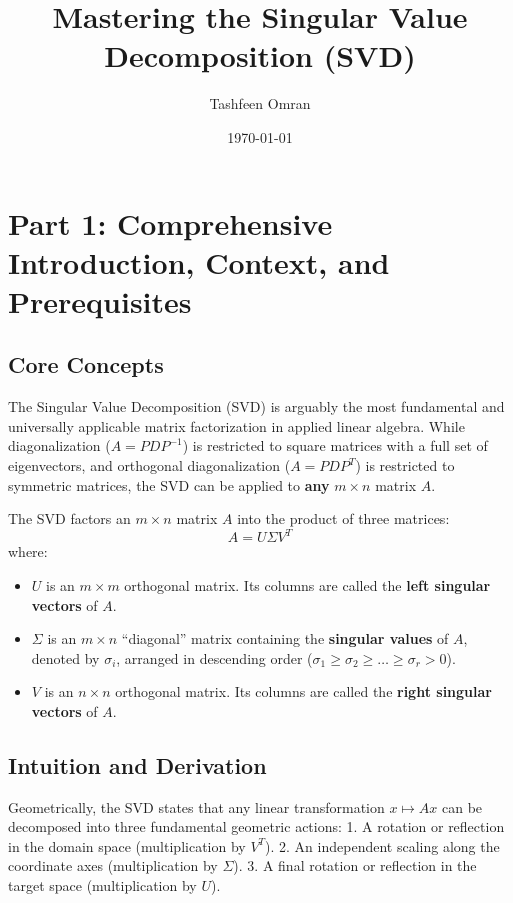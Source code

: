 \documentclass[11pt, letterpaper]{article}
\theoremstyle{definition}
\theoremstyle{remark}
\begin{document}
\title{\textbf{Mastering the Singular Value Decomposition (SVD)}}
\author{Tashfeen Omran}
\date{\today}
\maketitle

\tableofcontents
\newpage

\section{Part 1: Comprehensive Introduction, Context, and Prerequisites}

\subsection{Core Concepts}
The Singular Value Decomposition (SVD) is arguably the most fundamental and universally applicable matrix factorization in applied linear algebra. While diagonalization ($A = PDP^{-1}$) is restricted to square matrices with a full set of eigenvectors, and orthogonal diagonalization ($A = PDP^T$) is restricted to symmetric matrices, the SVD can be applied to \textbf{any} $m \times n$ matrix $A$. 

The SVD factors an $m \times n$ matrix $A$ into the product of three matrices:
\[ A = U \Sigma V^T \]
where:
\begin{itemize}
    \item $U$ is an $m \times m$ orthogonal matrix. Its columns are called the \textbf{left singular vectors} of $A$.
    \item $\Sigma$ is an $m \times n$ ``diagonal'' matrix containing the \textbf{singular values} of $A$, denoted by $\sigma_i$, arranged in descending order ($\sigma_1 \geq \sigma_2 \geq \dots \geq \sigma_r > 0$).
    \item $V$ is an $n \times n$ orthogonal matrix. Its columns are called the \textbf{right singular vectors} of $A$.
\end{itemize}

\subsection{Intuition and Derivation}
Geometrically, the SVD states that any linear transformation $x \mapsto Ax$ can be decomposed into three fundamental geometric actions:
1. A rotation or reflection in the domain space (multiplication by $V^T$).
2. An independent scaling along the coordinate axes (multiplication by $\Sigma$).
3. A final rotation or reflection in the target space (multiplication by $U$).
\end{document}
